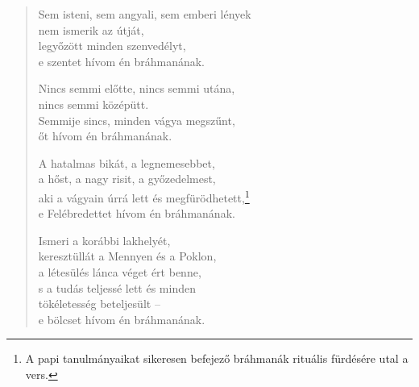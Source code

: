 \begin{verse}
 Sem isteni, sem angyali, sem emberi lények\\
nem ismerik az útját,\\
legyőzött minden szenvedélyt,\\
e szentet hívom én bráhmanának.

 Nincs semmi előtte, nincs semmi utána,\\
nincs semmi középütt.\\
Semmije sincs, minden vágya megszűnt,\\
őt hívom én bráhmanának.

 A hatalmas bikát, a legnemesebbet,\\
a hőst, a nagy risit, a győzedelmest,\\
aki a vágyain úrrá lett és megfürödhetett,\footnote{A papi tanulmányaikat sikeresen befejező bráhmanák rituális fürdésére utal a vers.}\\
e Felébredettet hívom én bráhmanának.

 Ismeri a korábbi lakhelyét,\\
keresztüllát a Mennyen és a Poklon,\\
a létesülés lánca véget ért benne,\\
s a tudás teljessé lett és minden\\
tökéletesség beteljesült –\\
e bölcset hívom én bráhmanának.

\end{verse}
